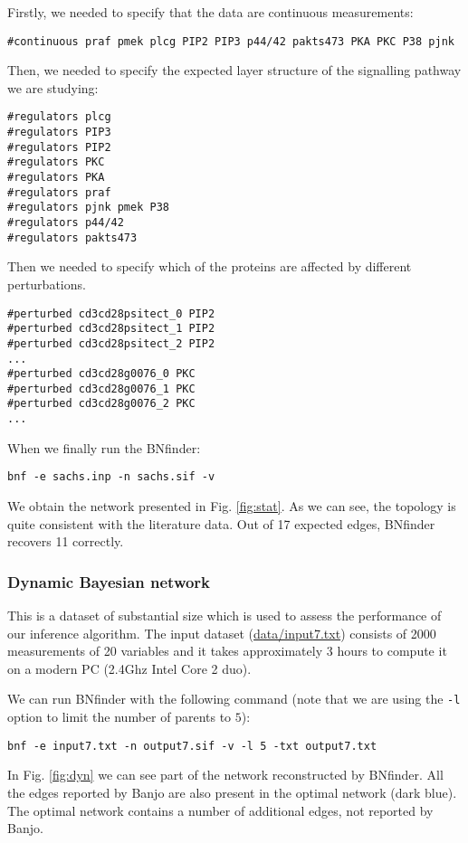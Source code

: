Firstly, we needed to specify that the data are continuous measurements:

\begin{verbatim}
#continuous praf pmek plcg PIP2 PIP3 p44/42 pakts473 PKA PKC P38 pjnk
\end{verbatim}

Then, we needed to specify the expected layer structure of the signalling pathway we are studying:
\begin{verbatim}
#regulators plcg
#regulators PIP3
#regulators PIP2
#regulators PKC
#regulators PKA
#regulators praf
#regulators pjnk pmek P38 
#regulators p44/42
#regulators pakts473
\end{verbatim}

Then we needed to specify which of the proteins are affected by different perturbations. 
\begin{verbatim}
#perturbed cd3cd28psitect_0 PIP2
#perturbed cd3cd28psitect_1 PIP2
#perturbed cd3cd28psitect_2 PIP2
...
#perturbed cd3cd28g0076_0 PKC
#perturbed cd3cd28g0076_1 PKC
#perturbed cd3cd28g0076_2 PKC
...
\end{verbatim}

When we finally run the BNfinder:
\begin{verbatim}
bnf -e sachs.inp -n sachs.sif -v 
\end{verbatim}
We obtain the network presented in Fig. \ref{fig:stat}. As we can see,
the topology is quite consistent with the literature data. Out of 17
expected edges, BNfinder recovers 11 correctly. 

\subsubsection{Dynamic Bayesian network}
\label{sec:realDyn}

This is a dataset of substantial size which is used  \cite{bnfinder} to
assess the performance of our inference algorithm. The input dataset
(\url{data/input7.txt}{}) consists of 2000 measurements of 20 variables
and it takes approximately 3 hours to compute it on a modern PC (2.4Ghz
Intel Core 2 duo). 

We can run BNfinder with the following command (note that we are
using the \texttt{-l} option to limit the number of parents to $5$):
\begin{verbatim}
bnf -e input7.txt -n output7.sif -v -l 5 -txt output7.txt
\end{verbatim}

In Fig. \ref{fig:dyn} we can see part of the network reconstructed by
BNfinder. All the edges reported by Banjo are also present in the
optimal network (dark blue). The optimal network contains a number of
additional edges, not reported by Banjo.

